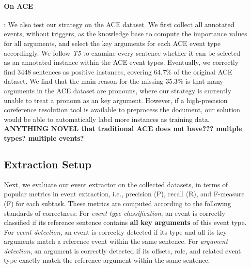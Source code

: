 


\paragraph{On ACE}: We also test our strategy on the ACE dataset. 
We first collect all annotated events, without triggers, as the knowledge base
to compute the importance values for all arguments, and select the key arguments 
for each ACE event type accordingly.  We follow \textit{T5} to examine every sentence
whether it can be selected as an annotated instance within  the ACE event types.
Eventually, we correctly find 3448 sentences as positive instances, covering 
64.7\% of the original ACE dataset.  We find that the main reason for the 
missing 35.3\% is that many arguments in the ACE dataset are pronouns, 
where our strategy is currently unable to treat a pronoun as an key argument. However,
if a high-precision coreference resolution tool is available to preprocess the document,
our solution would be able to automatically label more instances as training data.
\textbf{ANYTHING NOVEL that traditional ACE does not have??? multple types? multiple events?}

 \subsection{Extraction Setup}\label{sec:evalevent}
Next, we evaluate our event extractor on the collected datasets,
in terms of popular metrics in event extraction, i.e., precision (P), recall (R), and F-measure (F) for each subtask. These metrics are computed according to the following standards of correctness: 
For \emph{event type classification}, an event is correctly classified if its reference sentence contains \textbf{all key arguments} of this event type. 
For \emph{event detection}, an event is correctly detected if its type and all its key arguments match a reference event within the same sentence.
For \emph{argument detection}, an argument is correctly detected if its offsets, role, and related event type exactly match the reference argument within the same sentence. 


